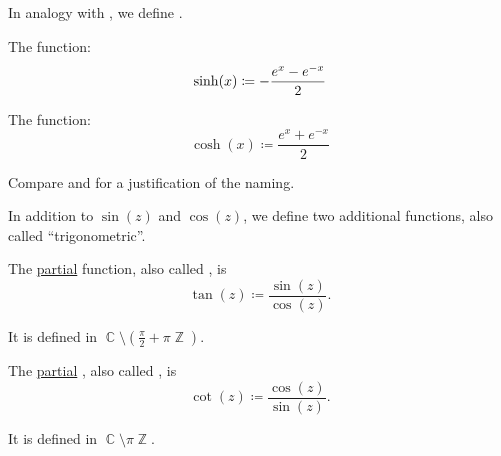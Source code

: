 \begin{definition}\label{def:hyperbolic_trigonometric_functions}
  In analogy with , we define .

  \begin{thmenum}
     The  function:
    \begin{equation*}
      \sinh(x) \coloneqq - \frac {e^x - e^{-x}} 2 \\
    \end{equation*}

     The  function:
    \begin{equation*}
      \cosh(x) \coloneqq \frac {e^x + e^{-x}} 2
    \end{equation*}
  \end{thmenum}

  Compare  and  for a justification of the naming.
\end{definition}

\begin{definition}\label{def:derived_trigonometric_functions}
  In addition to \( \sin(z) \) and \( \cos(z) \), we define two additional functions, also called \enquote{trigonometric}.

  \begin{thmenum}
     The \hyperref[def:function/partial]{partial}  function, also called , is
    \begin{equation*}
      \tan(z) \coloneqq \frac {\sin(z)} {\cos(z)}.
    \end{equation*}

    It is defined in \( \BbbC \setminus (\tfrac \pi 2 + \pi\BbbZ) \).

     The \hyperref[def:function/partial]{partial} , also called , is
    \begin{equation*}
      \cot(z) \coloneqq \frac {\cos(z)} {\sin(z)}.
    \end{equation*}

    It is defined in \( \BbbC \setminus \pi\BbbZ \).
  \end{thmenum}
\end{definition}

